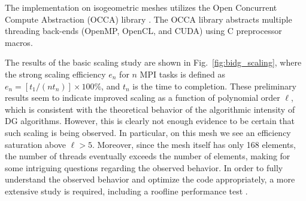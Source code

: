 The implementation on isogeometric meshes utilizes the Open Concurrent Compute
Abstraction (OCCA) library \cite{MedinaPress}.  The OCCA library abstracts
multiple threading back-ends (OpenMP, OpenCL, and CUDA) using C preprocessor
macros.


The results of the basic scaling study are shown in
Fig.~\ref{fig:bidg_scaling}, where the strong scaling efficiency $e_{n}$ for
$n$ MPI tasks is defined as $e_{n}= [t_{1}/(nt_{n})]\times 100\%$, and $t_n$ is the time to
completion. These preliminary results seem to indicate improved scaling as a function of polynomial order $\ell$, which is consistent with the theoretical
behavior of the algorithmic intensity of DG algorithms.  However, this is
clearly not enough evidence to be certain that such scaling is being observed.
In particular, on this mesh we see an efficiency saturation above $\ell>5$.
Moreover, since the mesh itself has only 168 elements, the number of threads
eventually exceeds the number of elements, making for some intriguing questions
regarding the observed behavior.  In order to fully understand the observed behavior and
optimize the code appropriately, a more extensive study is required, including
%
a roofline performance test
\cite{Williams:2009:RIV:1498765.1498785}.

%
%




